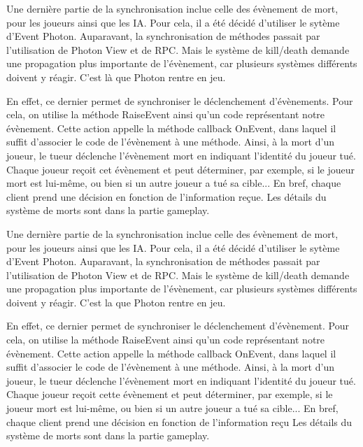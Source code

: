             Une dernière partie de la synchronisation inclue celle des évènement de mort, pour les joueurs ainsi
            que les IA. Pour cela, il a été décidé d'utiliser le sytème d'Event Photon. Auparavant, la synchronisation de méthodes
            passait par l'utilisation de Photon View et de RPC. Mais le système de kill/death demande une propagation plus importante
            de l'évènement, car plusieurs systèmes différents doivent y réagir. C'est là que Photon rentre en jeu.

            En effet, ce dernier permet de synchroniser le déclenchement d'évènements. Pour cela, on utilise la méthode RaiseEvent ainsi
            qu'un code représentant notre évènement. Cette action appelle la méthode callback OnEvent, dans laquel il suffit d'associer le
            code de l'évènement à une méthode. Ainsi, à la mort d'un joueur, le tueur déclenche l'évènement mort en indiquant l'identité du
            joueur tué. Chaque joueur reçoit cet évènement et peut déterminer, par exemple, si le joueur mort est lui-même, ou bien si un
            autre joueur a tué sa cible... En bref, chaque client prend une décision en fonction de l'information reçue.
            Les détails du système de morts sont dans la partie gameplay.

            Une dernière partie de la synchronisation inclue celle des évènement de mort, pour les joueurs ainsi
            que les IA. Pour cela, il a été décidé d'utiliser le sytème d'Event Photon. Auparavant, la synchronisation de méthodes
            passait par l'utilisation de Photon View et de RPC. Mais le système de kill/death demande une propagation plus importante
            de l'évènement, car plusieurs systèmes différents doivent y réagir. C'est la que Photon rentre en jeu.

            En effet, ce dernier permet de synchroniser le déclenchement d'évènement. Pour cela, on utilise la méthode RaiseEvent ainsi
            qu'un code représentant notre évènement. Cette action appelle la méthode callback OnEvent, dans laquel il suffit d'associer le
            code de l'évènement à une méthode. Ainsi, à la mort d'un joueur, le tueur déclenche l'évènement mort en indiquant l'identité du
            joueur tué. Chaque joueur reçoit cette évènement et peut déterminer, par exemple, si le joueur mort est lui-même, ou bien si un
            autre joueur a tué sa cible... En bref, chaque client prend une décision en fonction de l'information reçu
            Les détails du système de morts sont dans la partie gameplay.


